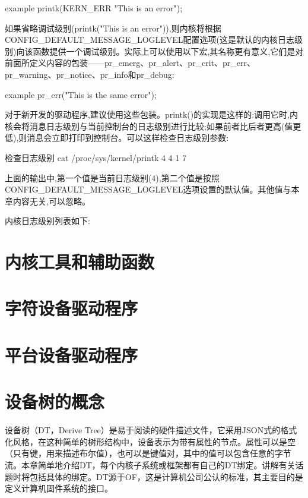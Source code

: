 \documentclass[lang=cn,newtx,10pt,scheme=chinese]{elegantbook}
\begin{document}
\begin{mycode}{example}
    printk(KERN_ERR "This is an error\n");
\end{mycode}

如果省略调试级别(printk("This is an error\n")),则内核将根据CONFIG\_DEFAULT\_MESSAGE\_LOGLEVEL配置选项(这是默认的内核日志级别)向该函数提供一个调试级别。实际上可以使用以下宏,其名称更有意义,它们是对前面所定义内容的包装——pr\_emerg、pr\_alert、pr\_crit、pr\_err、pr\_warning、pr\_notice、pr\_info和pr\_debug:

\begin{mycode}{example}
    pr_err("This is the same error\n");
\end{mycode}

对于新开发的驱动程序,建议使用这些包装。printk()的实现是这样的:调用它时,内核会将消息日志级别与当前控制台的日志级别进行比较;如果前者比后者更高(值更低),则消息会立即打印到控制台。可以这样检查日志级别参数:

\begin{mycode}{检查日志级别}
    cat /proc/sys/kernel/printk
    4 4 1 7
\end{mycode}

上面的输出中,第一个值是当前日志级别(4),第二个值是按照CONFIG\_DEFAULT\_MESSAGE\_LOGLEVEL选项设置的默认值。其他值与本章内容无关,可以忽略。

内核日志级别列表如下:

\chapter{内核工具和辅助函数}



\chapter{字符设备驱动程序}

\chapter{平台设备驱动程序}

\chapter{设备树的概念}

设备树（DT，Derive Tree）是易于阅读的硬件描述文件，它采用JSON式的格式化风格，在这种简单的树形结构中，设备表示为带有属性的节点。属性可以是空（只有键，用来描述布尔值），也可以是键值对，其中的值可以包含任意的字节流。本章简单地介绍DT，每个内核子系统或框架都有自己的DT绑定。讲解有关话题时将包括具体的绑定。DT源于OF，这是计算机公司公认的标准，其主要目的是定义计算机固件系统的接口。
\end{document}
